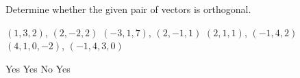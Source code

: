 
\begin{Exercise}[
name={},
title={}, 
difficulty=0,
origin={\cite{SM}}]
Determine whether the given pair of vectors is orthogonal.
\begin{multicols}{2}
\Question $(1,3,2)$, $(2,-2,2)$
\Question $(-3,1,7)$, $(2,-1,1)$
\Question $(2,1,1)$, $(-1,4,2)$
\Question $(4,1,0,-2)$, $(-1,4,3,0)$
\EndCurrentQuestion
\end{multicols}
\end{Exercise}

\begin{Answer}
\Question Yes
\Question Yes
\Question No
\Question Yes
\end{Answer}
